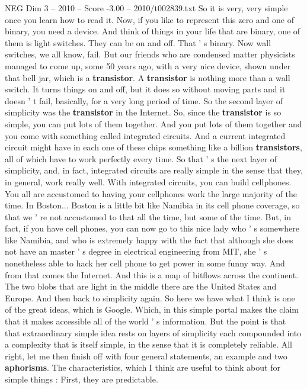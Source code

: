 \begin{textsample}{NEG Dim 3 – 2010 – Score -3.00 – 2010/t002839.txt}
So it is very, very simple once you learn how to read it.
Now, if you like to represent this zero and one of binary, you need a device.
And think of things in your life that are binary, one of them is light switches.
They can be on and off.
That ' s binary.
Now wall switches, we all know, fail.
But our friends who are condensed matter physicists managed to come up, some 50 years ago, with a very nice device, shown under that bell jar, which is a \textbf{transistor}.
A \textbf{transistor} is nothing more than a wall switch.
It turns things on and off, but it does so without moving parts and it doesn ' t fail, basically, for a very long period of time.
So the second layer of simplicity was the \textbf{transistor} in the Internet.
So, since the \textbf{transistor} is so simple, you can put lots of them together.
And you put lots of them together and you come with something called integrated circuits.
And a current integrated circuit might have in each one of these chips something like a billion \textbf{transistors}, all of which have to work perfectly every time.
So that ' s the next layer of simplicity, and, in fact, integrated circuits are really simple in the sense that they, in general, work really well.
With integrated circuits, you can build cellphones.
You all are accustomed to having your cellphones work the large majority of the time.
In Boston...
Boston is a little bit like Namibia in its cell phone coverage, so that we ' re not accustomed to that all the time, but some of the time.
But, in fact, if you have cell phones, you can now go to this nice lady who ' s somewhere like Namibia, and who is extremely happy with the fact that although she does not have an master ' s degree in electrical engineering from MIT, she ' s nonetheless able to hack her cell phone to get power in some funny way.
And from that comes the Internet.
And this is a map of bitflows across the continent.
The two blobs that are light in the middle there are the United States and Europe.
And then back to simplicity again.
So here we have what I think is one of the great ideas, which is Google.
Which, in this simple portal makes the claim that it makes accessible all of the world ' s information.
But the point is that that extraordinary simple idea rests on layers of simplicity each compounded into a complexity that is itself simple, in the sense that it is completely reliable.
All right, let me then finish off with four general statements, an example and two \textbf{aphorisms}.
The characteristics, which I think are useful to think about for simple things : First, they are predictable.

\end{textsample}
